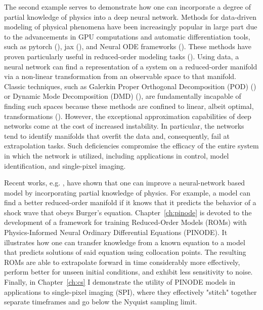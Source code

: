 The second example serves to demonstrate how one can incorporate a degree of partial knowledge of physics into a deep neural network. Methods for data-driven modeling of physical phenomena have been increasingly popular in large part due to the advancements in GPU computations and automatic differentiation tools, such as pytorch (\cite{pytorch}), jax (\cite{jax2018github}), and Neural ODE frameworks (\cite{chen2018neuralode}). These methods have proven particularly useful in reduced-order modeling tasks (\cite{rackauckas2020udes}).  Using data, a neural network can find a representation of a system on a reduced-order manifold via a non-linear transformation from an observable space to that manifold. Classic techniques, such as Galerkin Proper Orthogonal Decomposition (POD) (\cite{fukunaga2013introduction}) or Dynamic Mode Decomposition (DMD) (\cite{schmid2022dynamic}), are fundamentally incapable of finding such spaces because these methods are confined to linear, albeit optimal, transformations (\cite{benner2015survey}). However, the exceptional approximation capabilities of deep networks come at the cost of increased instability. In particular, the networks tend to identify manifolds that overfit the data and, consequently, fail at extrapolation tasks. Such deficiencies compromise the efficacy of the entire system in which the network is utilized, including applications in control, model identification, and single-pixel imaging.

Recent works, e.g. \cite{raissi2019physics,liu2022physics}, have shown that one can improve a neural-network based model by incorporating partial knowledge of physics. For example, a model can find a better reduced-order manifold if it knows that it predicts the behavior of a shock wave that obeys Burger's equation. Chapter~\ref{ch:pinode} is devoted to the development of a framework for training Reduced-Order Models (ROMs) with Physics-Informed Neural Ordinary Differential Equations (PINODE). It illustrates how one can transfer knowledge from a known equation to a model that predicts solutions of said equation using collocation points.  The resulting ROMs are able to extrapolate forward in time considerably more effectively,  perform better for unseen initial conditions, and exhibit less sensitivity to noise. Finally, in Chapter~\ref{ch:cs} I demonstrate the utility of PINODE models in applications to single-pixel imaging (SPI), where they effectively "stitch" together separate timeframes and go below the Nyquist sampling limit.

